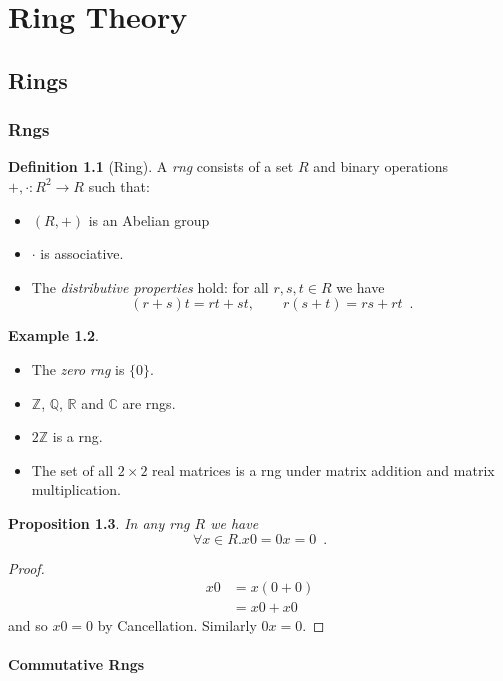 \documentclass{book}
\let\qed\relax
\newtheorem{prop}{Proposition}[chapter]
\theoremstyle{definition}
\newtheorem{df}[prop]{Definition}
\newtheorem{ex}[prop]{Example}
\begin{document}
\part{Ring Theory}

\chapter{Rings}

\section{Rngs}

\begin{df}[Ring]
A \emph{rng} consists of a set $R$ and binary operations $+, \cdot : R^2 \rightarrow R$ such that:
\begin{itemize}
\item $(R,+)$ is an Abelian group
\item $\cdot$ is associative.
\item The \emph{distributive properties} hold: for all $r,s,t \in R$ we have
\[ (r+s)t = rt + st, \qquad r(s+t) = rs + rt \enspace .\]
\end{itemize}
\end{df}

\begin{ex}
\begin{itemize}
\item The \emph{zero rng} is $\{0\}$.
\item $\mathbb{Z}$, $\mathbb{Q}$, $\mathbb{R}$ and $\mathbb{C}$ are rngs.
\item
$2 \mathbb{Z}$ is a rng.
\item
The set of all $2 \times 2$ real matrices is a rng under matrix addition and matrix multiplication.
\end{itemize}
\end{ex}

\begin{prop}
In any rng $R$ we have
\[ \forall x \in R. x0 = 0x = 0 \enspace . \]
\end{prop}

\begin{proof}
\pf
\begin{align*}
x0 & = x(0+0) \\
& = x0+x0
\end{align*}
and so $x0 = 0$ by Cancellation. Similarly $0x = 0$. \qed
\end{proof}

\subsection{Commutative Rngs}
\end{document}
